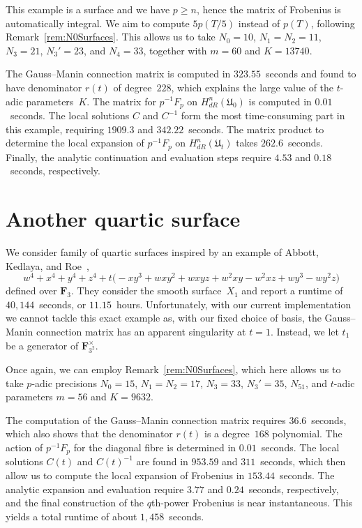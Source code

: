 This example is a surface and we have $p \geq n$, hence the matrix of Frobenius 
is automatically integral.  We aim to compute $5 p(T/5)$ instead of $p(T)$, 
following Remark~\ref{rem:N0Surfaces}.  This allows us to take $N_0 = 10$, 
$N_1 = N_2 = 11$, $N_3 = 21$, $N_3' = 23$, and $N_4 = 33$, together with 
$m = 60$ and $K = 13740$.

The Gauss--Manin connection matrix is computed in $323.55$~seconds and found 
to have denominator $r(t)$ of degree~$228$, which explains the large value 
of the $t$-adic parameters~$K$.  The matrix for $p^{-1} F_p$ on 
$H_{dR}^{n}(\mathfrak{U}_0)$ is computed in $0.01$~seconds.  The local 
solutions $C$ and $C^{-1}$ form the most time-consuming part in this example, 
requiring $1909.3$ and $342.22$~seconds.  The matrix product to determine the 
local expansion of $p^{-1} F_p$ on $H_{dR}^{n}(\mathfrak{U}_t)$ takes 
$262.6$~seconds. Finally, the analytic continuation and evaluation steps 
require $4.53$ and $0.18$~seconds, respectively.

\section{Another quartic surface}

We consider family of quartic surfaces inspired by an example of 
Abbott, Kedlaya, and Roe~\citep[Example~4.2.1]{AbbottKedlayaRoe2006}, 
\begin{equation*}
w^4 + x^4 + y^4 + z^4 + t \bigl(
    -x y^3 + w x y^2 + w x y z  + w^2 x y - w^2 x z + w y^3 - w y^2 z \bigr) 
\end{equation*}
defined over $\mathbf{F}_3$.  They consider the smooth surface~$X_1$ 
and report a runtime of $40,144$~seconds, or $11.15$~hours.  Unfortunately, 
with our current implementation we cannot tackle this exact example 
as, with our fixed choice of basis, the Gauss--Manin connection matrix 
has an apparent singularity at $t = 1$.  Instead, we let $t_1$ be a 
generator of $\mathbf{F}_{3^2}^{\times}$.

Once again, we can employ Remark~\ref{rem:N0Surfaces}, which here allows 
us to take $p$-adic precisions $N_0 = 15$, $N_1 = N_2 = 17$, $N_3 = 33$, 
$N_3' = 35$, $N_51$, and $t$-adic parameters $m = 56$ and $K = 9632$.

The computation of the Gauss--Manin connection matrix requires $36.6$~seconds, 
which also shows that the denominator $r(t)$ is a degree~$168$ polynomial.
The action of $p^{-1} F_p$ for the diagonal fibre is determined in 
$0.01$~seconds.  The local solutions $C(t)$ and $C(t)^{-1}$ are found in 
$953.59$ and $311$~seconds, which then allow us to compute the local expansion 
of Frobenius in $153.44$~seconds.  The analytic expansion and 
evaluation require $3.77$ and $0.24$~seconds, respectively, and the final 
construction of the $q$th-power Frobenius is near instantaneous. 
This yields a total runtime of about $1,458$~seconds.

